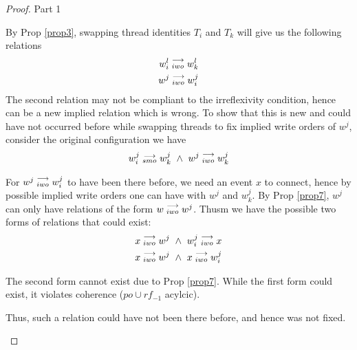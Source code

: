 \begin{proof}{Part 1}
\begin{itemize}
                        By Prop \ref{prop3}, swapping thread identities $T_i$ and $T_k$ will give us the following relations 
                        \begin{align*}
                            w_i^l\stackrel{\longrightarrow}{_{iwo}}w_k^l \\ 
                            w^j\stackrel{\longrightarrow}{_{iwo}}w_i^j 
                        \end{align*}
                        The second relation may not be compliant to the irreflexivity condition, hence can be a new implied relation which  is   wrong. To show that this is new and could have not occurred before while swapping threads to fix implied write  orders of  $w^j$, consider the original configuration we have 
                        \begin{align*}
                            \reln{w_i^j}{smo}{w_k^j} \ \wedge \ \reln{w^j}{iwo}{w_k^j}
                        \end{align*}

                        For $w^j\stackrel{\longrightarrow}{_{iwo}}w_i^j$ to have been there before, we need an event $x$ to connect, hence by possible implied  write    orders one can have with $w^j$ and $w_k^j$. By Prop \ref{prop7}, $w^j$ can only have relations of the form  $w\stackrel{\longrightarrow}{_{iwo}}w^j$. Thusm we have the possible two forms of relations that could exist:
                        \begin{align*}
                            \reln{x}{iwo}{w^j} \ \wedge \ \reln{w_i^j}{iwo}{x} \\
                            \reln{x}{iwo}{w^j} \ \wedge \ \reln{x}{iwo}{w_i^j} \\ 
                        \end{align*}

                        The second form cannot exist due to Prop \ref{prop7}. While the first form could exist, it violates coherence ($po  \cup rf_ {-1}$ acylcic). 

                        Thus, such a relation could have not been there before, and hence was not fixed. 

                \end{itemize}
            
        \end{proof}

